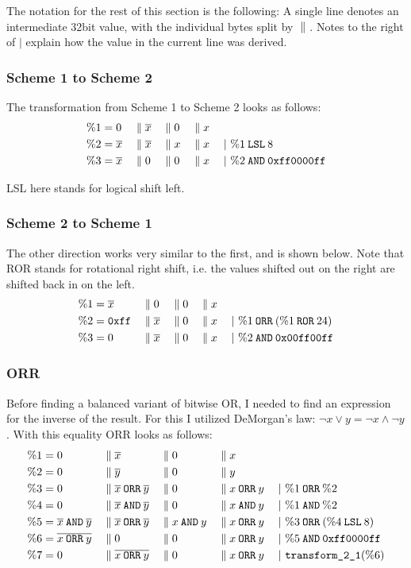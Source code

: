 The notation for the rest of this section is the following:
A single line denotes an intermediate 32bit value, with the individual bytes split by $\bsep{}$.
Notes to the right of $|$ explain how the value in the current line was derived.

\subsubsection{Scheme 1 to Scheme 2}
The transformation from Scheme 1 to Scheme 2 looks as follows:
\begin{align*}
  \binp{1}{0}{\neg{x}}{0}{x}\\
  \btrans{2}{\neg{x}}{\neg{x}}{x}{x}{\%1 \blsl 8}\\
  \btrans{3}{\neg{x}}{0}{0}{x}{\%2 \band \hex{ff0000ff}}
\end{align*}

LSL here stands for logical shift left.

\subsubsection{Scheme 2 to Scheme 1}
The other direction works very similar to the first, and is shown below.
Note that ROR stands for rotational right shift, i.e. the values shifted out on the right are shifted back in on the left.
\begin{align*}
  \binp{1}{\neg{x}}{0}{0}{x}\\
  \btrans{2}{\hex{ff}}{\neg{x}}{0}{x}{\%1 \borr (\%1 \bror 24)}\\
  \btrans{3}{0}{\neg{x}}{0}{x}{\%2 \band \hex{00ff00ff}}
\end{align*}

\subsubsection{ORR}
Before finding a balanced variant of bitwise OR, I needed to find an expression for the inverse of the result.
For this I utilized DeMorgan's law: $\neg{x \lor y} = \neg{x} \land \neg{y}$.
With this equality ORR looks as follows:
\begin{align*}
  \binp{1}{0}{\neg{x}}{0}{x}\\
  \binp{2}{0}{\neg{y}}{0}{y}\\
  \btrans{3}{0}{\neg{x} \borr \neg{y}}{0}{x \borr y}{\%1 \borr \%2}\\
  \btrans{4}{0}{\neg{x} \band \neg{y}}{0}{x \band y}{\%1 \band \%2}\\
  \btrans{5}{\neg{x} \band \neg{y}}{\neg{x} \borr \neg{y}}{x \band y}{x \borr y}{\%3 \borr (\%4 \blsl 8)}\\
  \btrans{6}{\neg{x \borr y}}{0}{0}{x \borr y}{\%5 \band \hex{ff0000ff}}\\
  \btrans{7}{0}{\neg{x \borr y}}{0}{x \borr y}{\trans21(\%6)}
\end{align*}

